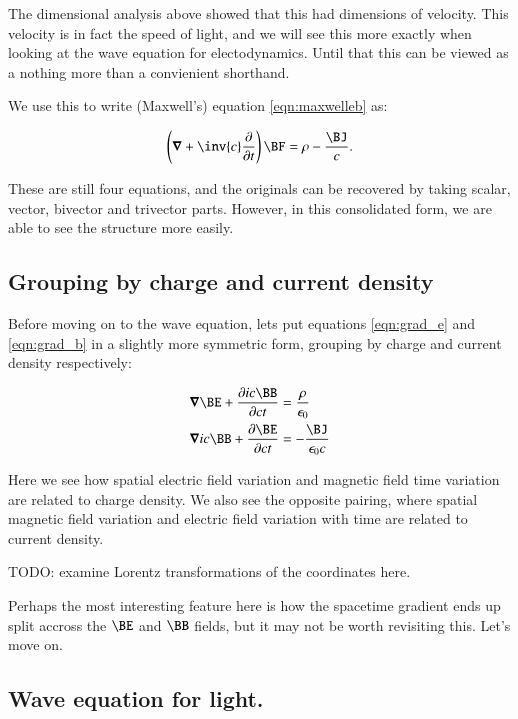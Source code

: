 \documentclass{article}
\newcommand{\spacegrad}[0]{\boldsymbol{\nabla}}
\begin{document}
The dimensional analysis above showed that this had dimensions of velocity.  This velocity is in fact the speed of light, and
we will see this more exactly when looking at the wave equation for electodynamics.  Until that this can be viewed as a
nothing more than a convienient shorthand.

We use this to write (Maxwell's) equation \ref{eqn:maxwelleb} as:

\begin{equation}\label{eqn:maxwellvs}
\left(\spacegrad + \inv{c}\frac{\partial}{\partial t} \right) \BF = \rho - \frac{\BJ}{c}.
\end{equation}

These are still four equations, and the originals can be recovered by taking scalar, vector, bivector and trivector parts.  However, in this
consolidated form, we are able to see the structure more easily.

\subsection{ Grouping by charge and current density }

Before moving on to the wave equation, lets put equations \ref{eqn:grad_e} and \ref{eqn:grad_b} in a slightly more symmetric form,
grouping by charge and current density respectively:

\begin{align}
\spacegrad \BE + \frac{\partial ic\BB}{\partial ct} &= \frac{\rho}{\epsilon_0} \label{eqn:gradE} \\
\spacegrad ic\BB + \frac{\partial \BE}{\partial ct} &= -\frac{\BJ}{\epsilon_0 c} \label{eqn:gradB}
\end{align}

Here we see how spatial electric field variation and magnetic field time variation are related to charge density.  We also see the
opposite pairing, where 
spatial magnetic field variation and electric field variation with time are related to current density.

TODO: examine Lorentz transformations of the coordinates here.

Perhaps the most interesting feature here is how the spacetime gradient ends up split accross the $\BE$ and $\BB$ fields, but 
it may not be worth revisiting this.  Let's move on.

\subsection{ Wave equation for light. }
\end{document}
